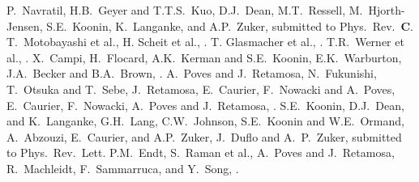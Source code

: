 \begin{thebibliography}{200}
P.\ Navratil, H.B.\ Geyer and T.T.S.\ Kuo, 
D.J.\ Dean, M.T.\ Ressell, M.\ Hjorth-Jensen, S.E.\ Koonin, 
K.\ Langanke, and A.P.\ Zuker, submitted to Phys.\ Rev.\ {\bf C}.
T.\ Motobayashi et al.,
H. Scheit et al., 
.
T. Glasmacher et al.,  
.
T.R.\ Werner et al., 
.
X.\ Campi, H.\ Flocard, A.K.\ Kerman and S.E.\ Koonin,
 E.K.\ Warburton, J.A.\ Becker and B.A.\ Brown, 
.
A.\ Poves and J.\ Retamosa, 
N.\ Fukunishi, T.\ Otsuka and T.\ Sebe, 
J.\ Retamosa, E.\ Caurier, F.\ Nowacki and A.\ Poves,
E.\ Caurier, F.\ Nowacki, A.\ Poves and J.\ Retamosa,
.
S.E.\ Koonin, D.J.\ Dean, and K.\ Langanke,
G.H.\ Lang, C.W.\ Johnson, S.E.\ Koonin and W.E.\ Ormand,
A.\ Abzouzi, E.\ Caurier, and A.P.\ Zuker, 
J.\ Duflo and A.\ P.\ Zuker, submitted to Phys.\ Rev.\ Lett.
P.M.\ Endt, 
 S.\ Raman et al., 
 A.\ Poves and J.\ Retamosa, 
R.\ Machleidt, F.\ Sammarruca, and Y.\ Song,
.

\end{thebibliography}
